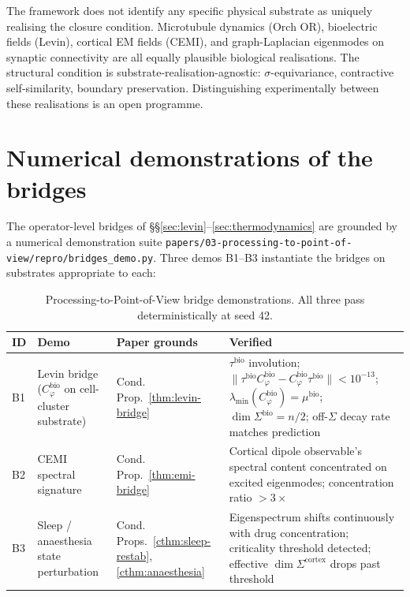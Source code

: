 \documentclass[11pt]{article}
\theoremstyle{plain}
\theoremstyle{definition}
\theoremstyle{remark}
\newcommand{\Cph}{C_\varphi}
\begin{document}
The framework does not identify any specific physical substrate as uniquely realising the closure condition. Microtubule dynamics (Orch OR), bioelectric fields (Levin), cortical EM fields (CEMI), and graph-Laplacian eigenmodes on synaptic connectivity are all equally plausible biological realisations. The structural condition is substrate-realisation-agnostic: $\sigma$-equivariance, contractive self-similarity, boundary preservation. Distinguishing experimentally between these realisations is an open programme.

\section{Numerical demonstrations of the bridges}\label{sec:bridges-numerical}

The operator-level bridges of \S\S\ref{sec:levin}--\ref{sec:thermodynamics} are grounded by a numerical demonstration suite \texttt{papers/03-processing-to-point-of-view/repro/bridges\_demo.py}. Three demos B1--B3 instantiate the bridges on substrates appropriate to each:

\begin{table}[h]
\centering
\small
\caption{Processing-to-Point-of-View bridge demonstrations. All three pass deterministically at seed 42.}\label{tab:bridges-numerical-demos}
\begin{tabular}{p{0.8cm}p{4.0cm}p{3.0cm}p{5.4cm}}
\toprule
ID & Demo & Paper grounds & Verified \\
\midrule
B1 & Levin bridge ($\Cph^{\mathrm{bio}}$ on cell-cluster substrate) & Cond. Prop.~\ref{thm:levin-bridge} & $\tau^{\mathrm{bio}}$ involution; $\|\tau^{\mathrm{bio}} \Cph^{\mathrm{bio}} - \Cph^{\mathrm{bio}} \tau^{\mathrm{bio}}\| < 10^{-13}$; $\lambda_{\min}(\Cph^{\mathrm{bio}}) = \mu^{\mathrm{bio}}$; $\dim \Sigma^{\mathrm{bio}} = n/2$; off-$\Sigma$ decay rate matches prediction \\
B2 & CEMI spectral signature & Cond. Prop.~\ref{thm:emi-bridge} & Cortical dipole observable's spectral content concentrated on excited eigenmodes; concentration ratio $> 3\times$ \\
B3 & Sleep / anaesthesia state perturbation & Cond. Props.~\ref{cthm:sleep-restab}, \ref{cthm:anaesthesia} & Eigenspectrum shifts continuously with drug concentration; criticality threshold detected; effective $\dim \Sigma^{\mathrm{cortex}}$ drops past threshold \\
\bottomrule
\end{tabular}
\end{table}
\end{document}
